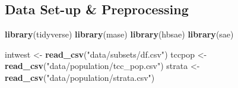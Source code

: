 \documentclass[12pt,twoside]{reedthesis}
\newenvironment{Shaded}{\begin{snugshade}}{\end{snugshade}}
\newcommand{\CommentTok}[1]{\textcolor[rgb]{0.56,0.35,0.01}{\textit{#1}}}
\newcommand{\DataTypeTok}[1]{\textcolor[rgb]{0.13,0.29,0.53}{#1}}
\newcommand{\KeywordTok}[1]{\textcolor[rgb]{0.13,0.29,0.53}{\textbf{#1}}}
\newcommand{\NormalTok}[1]{#1}
\newcommand{\OperatorTok}[1]{\textcolor[rgb]{0.81,0.36,0.00}{\textbf{#1}}}
\newcommand{\StringTok}[1]{\textcolor[rgb]{0.31,0.60,0.02}{#1}}
\begin{document}
\hypertarget{data-set-up-preprocessing}{%
\subsection{Data Set-up \& Preprocessing}\label{data-set-up-preprocessing}}
\begin{Shaded}
\begin{Highlighting}[]
\KeywordTok{library}\NormalTok{(tidyverse)}
\KeywordTok{library}\NormalTok{(mase)}
\KeywordTok{library}\NormalTok{(hbsae)}
\KeywordTok{library}\NormalTok{(sae)}
\end{Highlighting}
\end{Shaded}
\begin{Shaded}
\begin{Highlighting}[]
\NormalTok{intwest <-}\StringTok{ }\KeywordTok{read_csv}\NormalTok{(}\StringTok{"data/subsets/df.csv"}\NormalTok{)}
\NormalTok{tccpop <-}\StringTok{ }\KeywordTok{read_csv}\NormalTok{(}\StringTok{"data/population/tcc_pop.csv"}\NormalTok{)}
\NormalTok{strata <-}\StringTok{ }\KeywordTok{read_csv}\NormalTok{(}\StringTok{"data/population/strata.csv"}\NormalTok{)}
\end{Highlighting}
\end{Shaded}
\begin{Shaded}
\end{Shaded}
\end{document}
